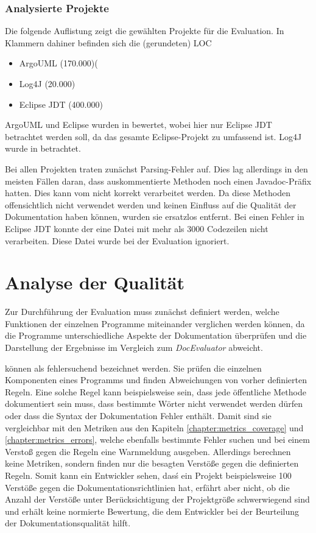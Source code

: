  \subsubsection{Analysierte Projekte}
 Die folgende Auflistung zeigt die gewählten Projekte für die Evaluation. In Klammern dahiner befinden sich die  (gerundeten) \ac{LOC}
 \begin{itemize}
    \item ArgoUML (170.000)(
     \item Log4J (20.000)
     \item Eclipse \ac{JDT} (400.000)
 \end{itemize}
 
 ArgoUML und Eclipse wurden in \cite[S. 74] {AutomaticQualityAssessmentofSourceCodeComments:TheJavadocMiner} bewertet, wobei hier nur Eclipse \ac{JDT} betrachtet werden soll, da das gesamte Eclipse-Projekt zu umfassend ist. Log4J wurde in \cite[S. 267] {@tComment:TestingJavadocCommentstoDetectComment-CodeInconsistencies} betrachtet. 

 Bei allen Projekten traten zunächst Parsing-Fehler auf. Dies lag allerdings in den meisten Fällen daran, dass auskommentierte Methoden noch einen Javadoc-Präfix hatten. Dies kann vom \doceval nicht korrekt verarbeitet werden. Da diese Methoden offensichtlich nicht verwendet werden und keinen Einfluss auf die Qualität der Dokumentation haben können, wurden sie ersatzlos entfernt. Bei einen Fehler in Eclipse JDT konnte der \doceval eine Datei mit mehr als 3000 Codezeilen nicht verarbeiten. Diese Datei wurde bei der Evaluation ignoriert.
\section{Analyse der Qualität}
Zur Durchführung der Evaluation muss zunächst definiert werden, welche Funktionen der einzelnen Programme miteinander verglichen werden können, da die Programme unterschiedliche Aspekte der Dokumentation überprüfen und die Darstellung der Ergebnisse im Vergleich zum \textit{DocEvaluator} abweicht.

\checkpmd können als fehlersuchend bezeichnet werden. Sie prüfen die einzelnen Komponenten eines Programms und finden Abweichungen von vorher definierten Regeln. Eine solche Regel kann beispielsweise sein, dass jede öffentliche Methode dokumentiert sein muss, dass bestimmte Wörter nicht verwendet werden dürfen oder dass die Syntax der Dokumentation Fehler enthält. Damit sind sie vergleichbar mit den Metriken aus den Kapiteln \ref{chapter:metrics_coverage}  und \ref{chapter:metrics_errors}, welche ebenfalls bestimmte Fehler suchen und bei einem Verstoß gegen die Regeln eine Warnmeldung ausgeben. Allerdings berechnen \checkpmd keine Metriken, sondern finden nur die besagten Verstöße gegen die definierten Regeln. Somit kann ein Entwickler sehen, dasś ein Projekt beispielsweise 100 Verstöße gegen die Dokumentationsrichtlinien hat, erfährt aber nicht, ob die Anzahl der Verstöße unter Berücksichtigung der Projektgröße schwerwiegend sind und erhält keine normierte Bewertung, die dem Entwickler bei der Beurteilung der Dokumentationsqualität hilft. 

